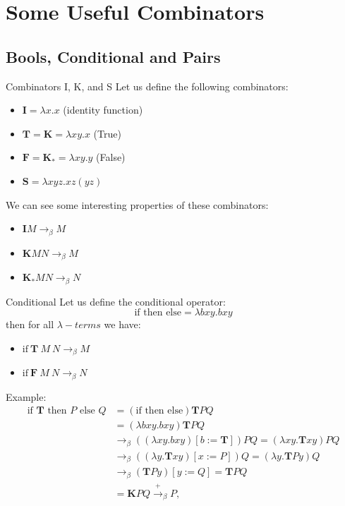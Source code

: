 \documentclass{beamer}
\begin{document}
\section{Some Useful Combinators}


\subsection{Bools, Conditional and Pairs}
\begin{frame}{Combinators I, K, and S}
  Let us define the following combinators:
  \begin{itemize}
    \item \( \mathbf{I} = \lambda x.x \) (identity function)
    \item \(\mathbf{T} = \textbf{K} = \lambda xy.x \) (True)

    \item \( \mathbf{F} =\mathbf{K}_* = \lambda xy.y \) (False)
    \item \( \mathbf{S} = \lambda xyz. xz(yz) \) 
  \end{itemize}
  We can see some interesting properties of these combinators:
  \begin{itemize}
    \item \(\mathbf{I}M \rightarrow_\beta M\)
    \item \(\mathbf{K}MN \rightarrow_\beta M\)
    \item \(\mathbf{K}_*MN \rightarrow_\beta N\)
  \end{itemize}
\end{frame}




\begin{frame}{Conditional}
  Let us define the conditional operator:
  \[
    \text{if then else} = \lambda bxy. bxy
  \]
  then for all \(\lambda-terms\) we have:

  \begin{itemize}
    \item \(\text{if}\ \mathbf{T}\ M\ N \rightarrow_\beta M\)
    \item \(\text{if}\ \mathbf{F}\ M\ N \rightarrow_\beta N\)
  \end{itemize}
  Example:
  \[
  \begin{aligned}
      \text{if } \mathbf{T} \text{ then } P \text{ else } Q &= (\text{if then else}) \mathbf{T} P Q \\
      &= (\lambda bxy. bxy) \mathbf{T} P Q \\
      &\rightarrow_{\beta} ((\lambda xy. bxy)[b := \mathbf{T}]) P Q = (\lambda xy. \mathbf{T}xy) P Q \\
      &\rightarrow_{\beta} ((\lambda y. \mathbf{T}xy)[x := P]) Q = (\lambda y. \mathbf{T}Py) Q \\
      &\rightarrow_{\beta} (\mathbf{T}Py)[y := Q] = \mathbf{T} P Q \\
      &= \mathbf{K} P Q \xrightarrow{+}_{\beta} P,
  \end{aligned}
  \]
\end{frame}
\end{document}
